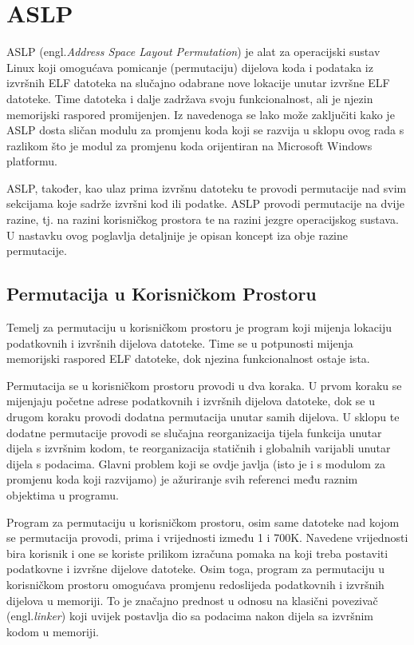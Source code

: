 \documentclass[times, utf8, diplomski, numeric]{fer}
\begin{document}
\section{ASLP}
\label{sct:aslp}

ASLP\citep{aslp} (engl.\emph{Address Space Layout Permutation})			%
je alat za operacijski sustav Linux koji omogućava pomicanje
(permutaciju) dijelova koda i podataka iz izvršnih ELF datoteka
na slučajno odabrane nove lokacije unutar izvršne ELF datoteke.
Time datoteka i dalje zadržava svoju funkcionalnost, ali je
njezin memorijski raspored promijenjen. Iz navedenoga se lako
može zaključiti kako je ASLP dosta sličan modulu za promjenu koda
koji se razvija u sklopu ovog rada s razlikom što je modul za
promjenu koda orijentiran na Microsoft Windows platformu. 

ASLP, također, kao ulaz prima izvršnu datoteku te provodi
permutacije nad svim sekcijama koje sadrže izvršni kod ili
podatke. ASLP provodi permutacije na dvije razine, tj. na razini
korisničkog prostora te na razini jezgre operacijskog sustava. U
nastavku ovog poglavlja detaljnije je opisan koncept iza obje
razine permutacije.

\subsection{Permutacija u Korisničkom Prostoru}

Temelj za permutaciju u korisničkom prostoru je program koji
mijenja lokaciju podatkovnih i izvršnih dijelova datoteke. Time
se u potpunosti mijenja memorijski raspored ELF datoteke, dok
njezina funkcionalnost ostaje ista.

Permutacija se u korisničkom prostoru provodi u dva koraka. U
prvom koraku se mijenjaju početne adrese podatkovnih i izvršnih
dijelova datoteke, dok se u drugom koraku provodi dodatna
permutacija unutar samih dijelova. U sklopu te dodatne
permutacije provodi se slučajna reorganizacija tijela funkcija
unutar dijela s izvršnim kodom, te reorganizacija statičnih i
globalnih varijabli unutar dijela s podacima. Glavni problem koji
se ovdje javlja (isto je i s modulom za promjenu koda koji
razvijamo) je ažuriranje svih referenci među raznim objektima u
programu.

Program za permutaciju u korisničkom prostoru, osim same datoteke
nad kojom se permutacija provodi, prima i vrijednosti između 1 i
700K. Navedene vrijednosti bira korisnik i one se koriste
prilikom izračuna pomaka na koji treba postaviti podatkovne i
izvršne dijelove datoteke. Osim toga, program za permutaciju u
korisničkom prostoru omogućava promjenu redoslijeda podatkovnih i
izvršnih dijelova u memoriji. To je značajno prednost u odnosu na
klasični povezivač (engl.\emph{linker}) koji uvijek postavlja dio
sa podacima nakon dijela sa izvršnim kodom u memoriji.
\end{document}
